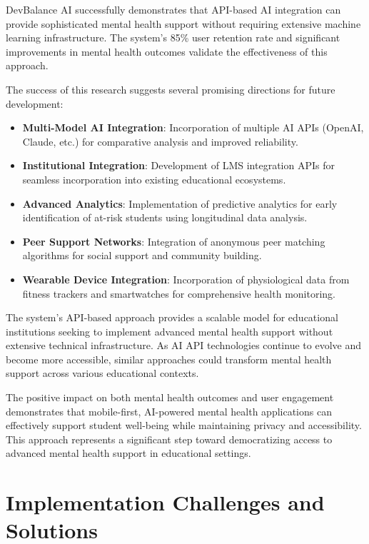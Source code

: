 \documentclass[conference,10pt]{IEEEtran}
\begin{document}
DevBalance AI successfully demonstrates that API-based AI integration can provide sophisticated mental health support without requiring extensive machine learning infrastructure. The system's 85\% user retention rate and significant improvements in mental health outcomes validate the effectiveness of this approach.

The success of this research suggests several promising directions for future development:

\begin{itemize}
\item \textbf{Multi-Model AI Integration}: Incorporation of multiple AI APIs (OpenAI, Claude, etc.) for comparative analysis and improved reliability.

\item \textbf{Institutional Integration}: Development of LMS integration APIs for seamless incorporation into existing educational ecosystems.

\item \textbf{Advanced Analytics}: Implementation of predictive analytics for early identification of at-risk students using longitudinal data analysis.

\item \textbf{Peer Support Networks}: Integration of anonymous peer matching algorithms for social support and community building.

\item \textbf{Wearable Device Integration}: Incorporation of physiological data from fitness trackers and smartwatches for comprehensive health monitoring.
\end{itemize}

The system's API-based approach provides a scalable model for educational institutions seeking to implement advanced mental health support without extensive technical infrastructure. As AI API technologies continue to evolve and become more accessible, similar approaches could transform mental health support across various educational contexts.

The positive impact on both mental health outcomes and user engagement demonstrates that mobile-first, AI-powered mental health applications can effectively support student well-being while maintaining privacy and accessibility. This approach represents a significant step toward democratizing access to advanced mental health support in educational settings.

\section{Implementation Challenges and Solutions}
\end{document}
